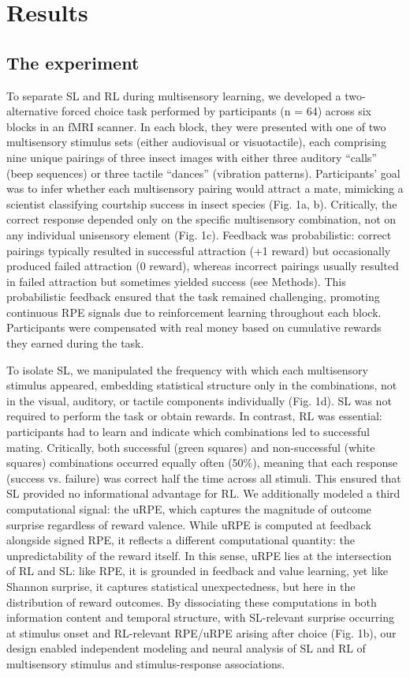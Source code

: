 \documentclass{article}
\begin{document}
\section*{Results}
\subsection*{The experiment}
To separate SL and RL during multisensory learning, we developed a two-alternative forced choice task performed by participants (n = 64) across six blocks in an fMRI scanner. In each block, they were presented with one of two multisensory stimulus sets (either audiovisual or visuotactile), each comprising nine unique pairings of three insect images with either three auditory “calls” (beep sequences) or three tactile “dances” (vibration patterns). Participants' goal was to infer whether each multisensory pairing would attract a mate, mimicking a scientist classifying courtship success in insect species (Fig. 1a, b). Critically, the correct response depended only on the specific multisensory combination, not on any individual unisensory element (Fig. 1c). Feedback was probabilistic: correct pairings typically resulted in successful attraction (+1 reward) but occasionally produced failed attraction (0 reward), whereas incorrect pairings usually resulted in failed attraction but sometimes yielded success (see Methods). This probabilistic feedback ensured that the task remained challenging, promoting continuous RPE signals due to reinforcement learning throughout each block. Participants were compensated with real money based on cumulative rewards they earned during the task.\newline 

To isolate SL, we manipulated the frequency with which each multisensory stimulus appeared, embedding statistical structure only in the combinations, not in the visual, auditory, or tactile components individually (Fig. 1d). SL was not required to perform the task or obtain rewards. In contrast, RL was essential: participants had to learn and indicate which combinations led to successful mating. Critically, both successful (green squares) and non-successful (white squares) combinations occurred equally often (50\%), meaning that each response (success vs. failure) was correct half the time across all stimuli. This ensured that SL provided no informational advantage for RL. We additionally modeled a third computational signal: the uRPE, which captures the magnitude of outcome surprise regardless of reward valence. While uRPE is computed at feedback alongside signed RPE, it reflects a different computational quantity: the unpredictability of the reward itself. In this sense, uRPE lies at the intersection of RL and SL: like RPE, it is grounded in feedback and value learning, yet like Shannon surprise, it captures statistical unexpectedness, but here in the distribution of reward outcomes. By dissociating these computations in both information content and temporal structure, with SL-relevant surprise occurring at stimulus onset and RL-relevant RPE/uRPE arising after choice (Fig. 1b), our design enabled independent modeling and neural analysis of SL and RL of multisensory stimulus and stimulus-response associations.\newline
\end{document}
